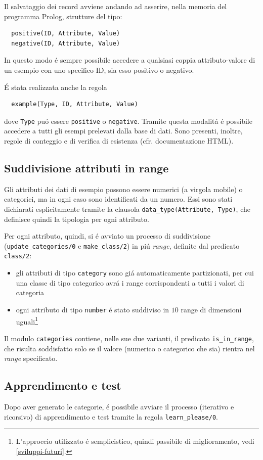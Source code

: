 \documentclass[preprint]{acm_proc_article-sp}
\begin{document}
Il salvataggio dei record avviene andando ad asserire, nella memoria del programma Prolog, strutture del tipo:
\begin{verbatim}
  positive(ID, Attribute, Value)
  negative(ID, Attribute, Value)
\end{verbatim}
In questo modo \'e sempre possibile accedere a qualsiasi coppia attributo-valore di un esempio con uno specifico ID, sia esso positivo o negativo.

\'E stata realizzata anche la regola
\begin{verbatim}
  example(Type, ID, Attribute, Value)
\end{verbatim}
dove \verb|Type| pu\'o essere \verb|positive| o \verb|negative|. Tramite questa modalit\'a \'e possibile accedere a tutti gli esempi prelevati dalla base di dati. Sono presenti, inoltre, regole di conteggio e di verifica di esistenza (cfr. documentazione HTML).

\subsection{Suddivisione attributi in range}
\label{prolog-categories}
Gli attributi dei dati di esempio possono essere numerici (a virgola mobile) o categorici, ma in ogni caso sono identificati da un numero. Essi sono stati dichiarati esplicitamente tramite la clausola \verb|data_type(Attribute, Type)|, che definisce quindi la tipologia per ogni attributo.

Per ogni attributo, quindi, si \'e avviato un processo di suddivisione (\verb|update_categories/0| e \verb|make_class/2|) in pi\'u \textit{range}, definite dal predicato \verb|class/2|:
\begin{itemize}
\item gli attributi di tipo \verb|category| sono gi\'a automaticamente partizionati, per cui una classe di tipo categorico avr\'a i range corrispondenti a tutti i valori di categoria
\item ogni attributo di tipo \verb|number| \'e stato suddiviso in $10$ range di dimensioni uguali\footnote{L'approccio utilizzato \'e semplicistico, quindi passibile di miglioramento, vedi \ref{sviluppi-futuri}.}
\end{itemize}

Il modulo \verb|categories| contiene, nelle sue due varianti, il predicato \verb|is_in_range|, che risulta soddisfatto solo se il valore (numerico o categorico che sia) rientra nel \textit{range} specificato.

\subsection{Apprendimento e test}
\label{prolog-learner}
Dopo aver generato le categorie, \'e possibile avviare il processo (iterativo e ricorsivo) di apprendimento e test tramite la regola \verb|learn_please/0|.
\end{document}
